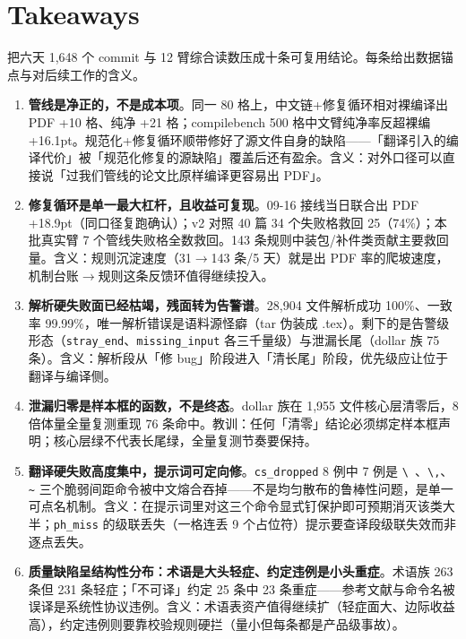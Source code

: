 \section{Takeaways}
\label{sec:takeaway}

把六天 1{,}648 个 commit 与 12 臂综合读数压成十条可复用结论。每条给出数据锚点与对后续工作的含义。

\begin{enumerate}
  \item \textbf{管线是净正的，不是成本项}。同一 80 格上，中文链+修复循环相对裸编译出 PDF +10 格、纯净 +21 格；compilebench 500 格中文臂纯净率反超裸编 +16.1pt。规范化+修复循环顺带修好了源文件自身的缺陷——「翻译引入的编译代价」被「规范化修复的源缺陷」覆盖后还有盈余。含义：对外口径可以直接说「过我们管线的论文比原样编译更容易出 PDF」。

  \item \textbf{修复循环是单一最大杠杆，且收益可复现}。09-16 接线当日联合出 PDF +18.9pt（同口径复跑确认）；v2 对照 40 篇 34 个失败格救回 25（74\%）；本批真实臂 7 个管线失败格全数救回。143 条规则中装包/补件类贡献主要救回量。含义：规则沉淀速度（31$\to$143 条/5 天）就是出 PDF 率的爬坡速度，机制台账$\to$规则这条反馈环值得继续投入。

  \item \textbf{解析硬失败面已经枯竭，残面转为告警谱}。28{,}904 文件解析成功 100\%、一致率 99.99\%，唯一解析错误是语料源怪癖（tar 伪装成 .tex）。剩下的是告警级形态（\texttt{stray\_end}、\texttt{missing\_input} 各三千量级）与泄漏长尾（dollar 族 75 条）。含义：解析段从「修 bug」阶段进入「清长尾」阶段，优先级应让位于翻译与编译侧。

  \item \textbf{泄漏归零是样本框的函数，不是终态}。dollar 族在 1{,}955 文件核心层清零后，8 倍体量全量复测重现 76 条命中。教训：任何「清零」结论必须绑定样本框声明；核心层绿不代表长尾绿，全量复测节奏要保持。

  \item \textbf{翻译硬失败高度集中，提示词可定向修}。\texttt{cs\_dropped} 8 例中 7 例是 \verb|\ |、\verb|\,|、\verb|~| 三个脆弱间距命令被中文熔合吞掉——不是均匀散布的鲁棒性问题，是单一可点名机制。含义：在提示词里对这三个命令显式钉保护即可预期消灭该类大半；\texttt{ph\_miss} 的级联丢失（一格连丢 9 个占位符）提示要查译段级联失效而非逐点丢失。

  \item \textbf{质量缺陷呈结构性分布：术语是大头轻症、约定违例是小头重症}。术语族 263 条但 231 条轻症；「不可译」约定 25 条中 23 条重症——参考文献与命令名被误译是系统性协议违例。含义：术语表资产值得继续扩（轻症面大、边际收益高），约定违例则要靠校验规则硬拦（量小但每条都是产品级事故）。


\end{enumerate}
